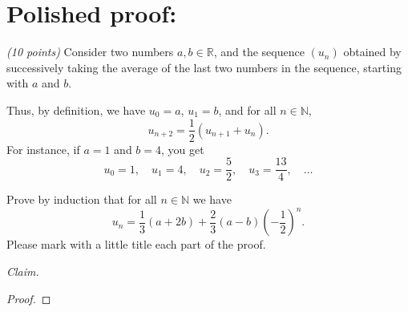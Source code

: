 \documentclass[12pt]{article}
\begin{document}
\section*{Polished proof:} 

\emph{(10 points)} Consider two numbers \( a, b \in \mathbb{R} \), and the sequence \( (u_n) \) obtained by successively taking the average of the last two numbers in the sequence, starting with \( a \) and \( b \). 

Thus, by definition, we have \( u_0 = a \), \( u_1 = b \), and for all \( n \in \mathbb{N} \),
\[
u_{n+2} = \frac12 \left( u_{n+1} + u_n \right).
\]
For instance, if \( a = 1 \) and \( b = 4 \), you get
\[
u_0 = 1, \quad u_1 = 4, \quad u_2 = \frac{5}{2}, \quad u_3 = \frac{13}{4}, \quad \dots
\]

Prove by induction that for all \( n \in \mathbb{N} \) we have
\[
u_n = \frac{1}{3} ( a + 2b) + \frac{2}{3} (a - b) \left( - \frac{1}{2} \right)^n.
\]
Please mark with a little title each part of the proof.



\noindent \emph{Claim.}

\begin{proof}
\end{proof}
\end{document}
